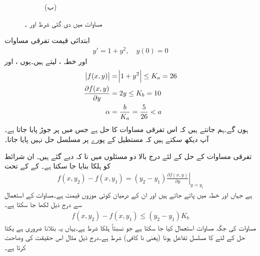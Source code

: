 \begin{figure}
\begin{subfigure}{0.5\textwidth}
\caption*{(ب)}
\end{subfigure}%
\caption{مساوات  میں دی گئی شرط اور ۔}
\label{شکل_سادہ_اول_مستطیل_ثبوت}
\end{figure}

ابتدائی قیمت تفرقی مساوات
\begin{align*}
y'=1+y^2,\quad y(0)=0
\end{align*}
اور خطہ ،  لیتے ہیں۔یوں ،   اور
\begin{align*}
\abs{f(x,y)}&=\abs{1+y^2}\le K_a=26\\
\frac{\partial f(x,y)}{\partial y}&=2y \le K_b=10\\
\alpha&=\frac{b}{K_a}=\frac{5}{26}< a
\end{align*}
ہوں گے۔ہم جانتے ہیں کہ اس تفرقی مساوات کا حل  ہے جس میں  پر جوڑ پایا جاتا ہے۔آپ دیکھ سکتے ہیں کہ مستطیل کے پورے  پر مسلسل حل نہیں پایا جاتا۔

تفرقی مساوات کے حل کے لئے درج بالا دو مسئلوں میں  نا کہ  دیے گئے ہیں۔ ان شرائط کو ہلکا بنایا جا سکتا ہے۔  کے  کے تحت
\begin{align*}
f(x,y_2)-f(x,y_1)=(y_2-y_1)\left. \frac{\partial f(x,y)}{\partial y}\right|_{y=y_{i}}
\end{align*}
ہے جہاں  اور  خطہ  میں پائے جاتے ہیں اور  ان کے درمیان کوئی  موزوں قیمت ہے۔مساوات  کے استعمال سے درج ذیل لکھا جا سکتا ہے۔
\begin{align}\label{مساوات_سادہ_اول_وجودیت_ث}
f(x,y_2)-f(x,y_1) \le (y_2-y_1) K_b
\end{align}
مساوات  کی جگہ  مساوات  استعمال کیا جا سکتا ہے جو نسبتاً ہلکا شرط ہے۔یہاں یہ بتلانا ضروری ہے یکتا حل کے لئے  کا مسلسل تفاعل ہونا  (یعنی نا کافی) شرط  ہے۔درج ذیل مثال اس حقیقت کی وضاحت کرتا ہے۔

